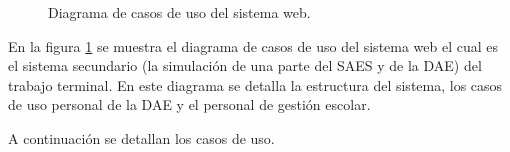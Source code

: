 \newpage

\begin{figure}[htbp!]
	\begin{center}
		\caption{Diagrama de casos de uso del sistema web.}
		\label{fig:casosDeUso2}
	\end{center}
\end{figure}


En la figura \ref{fig:casosDeUso2} se muestra el diagrama de casos de uso del sistema web el cual es el sistema secundario (la simulación de una parte del SAES y de la DAE) del trabajo terminal. En este diagrama se detalla la estructura del sistema, los casos de uso personal de la DAE y el personal de gestión escolar.

A continuación se detallan los casos de uso.



\newpage


\newpage


\newpage


\newpage


\newpage


\newpage


\newpage


\newpage


\newpage


\newpage


\newpage


\newpage


\newpage


\newpage


\newpage

%
\newpage

